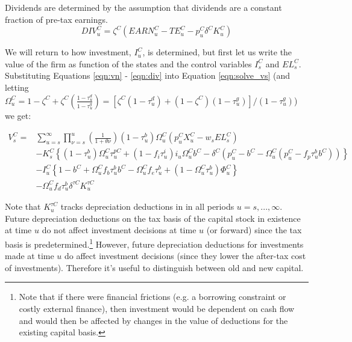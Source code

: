 Dividends are determined by the assumption that dividends are a constant fraction of pre-tax earnings.
\begin{equation}
\label{eqn:div}
DIV^{C}_{u}=\zeta^{C}(EARN^{C}_{u}-TE^{C}_{u}-p^{C}_{u}\delta^{C}K^{C}_{u})
\end{equation}

We will return to how investment, $I^{C}_{u}$, is determined, but first let us write the value of the firm as function of the states and the control variables $I^{C}_{s}$ and $EL^{C}_{s}$.  Substituting Equations \ref{eqn:vn} - \ref{eqn:div} into Equation \ref{eqn:solve_vs}  (and letting $\Omega^{C}_{u}=1 - \zeta^{C} + \zeta^{C}\left(\frac{1-\tau^{d}_{u}}{1-\tau^{g}_{u}}\right) = \left[\zeta^{C}(1-\tau^{d}_{u}) + (1-\zeta^{C})(1-\tau^{g}_{u})\right]/(1-\tau^{g}_{u})$) we get:

\begin{equation}
\label{eqn:vs}
\begin{split}
V^{C}_{s} = &  \sum_{u=s}^{\infty} \prod_{\nu=s}^{u}\left(\frac{1}{1+\theta{\nu}}\right) (1-\tau^{b}_{u})\Omega^{C}_{u}(p^{C}_{u}X^{C}_{u}-w_{s}EL^{C}_{s})  \\ 
 & - K^{C}_{s} \left\{(1-\tau^{b}_{u})\Omega^{C}_{u}\tau^{pC}_{u}+(1-f_{i}\tau^{i}_{u})i_{u}\Omega^{C}_{u}b^{C}-\delta^{C}(p^{C}_{u}-b^{C}-\Omega^{C}_{u}(p^{C}_{u}-f_{p}\tau^{b}_{u}b^{C}))\right\}  \\
 & - I^{C}_{u}\left\{1-b^{C}+\Omega^{C}_{u}f_{b}\tau^{b}_{u}b^{C}-\Omega^{C}_{u}f_{e}\tau^{b}_{u} + (1-\Omega^{C}_{u}\tau^{b}_{u})\Phi^{C}_{u}\right\} \\
 & - \Omega^{C}_{u}f_{d}\tau^{b}_{u}\delta^{\tau C}K^{\tau C}_{u}
\end{split}
\end{equation}

Note that $K^{\tau C}_{u}$ tracks depreciation deductions in in all periods $u=s,...,\infty$.  Future depreciation deductions on the tax basis of the capital stock in existence at time $u$ do not affect investment decisions at time $u$ (or forward) since the tax basis is predetermined.\footnote{Note that if there were financial frictions (e.g. a borrowing constraint or costly external finance), then investment would be dependent on cash flow and would then be affected by changes in the value of deductions for the existing capital basis.}  However, future depreciation deductions for investments made at time $u$ do affect investment decisions (since they lower the after-tax cost of investments).  Therefore it's useful to distinguish between old and new capital. 


